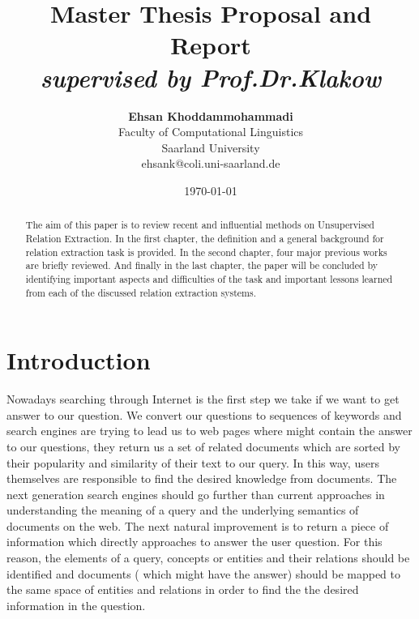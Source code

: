 \documentclass[12pt]{report}
\title{{\bf Master Thesis Proposal and Report} \\
\it supervised by Prof.Dr.Klakow}
\author{ {\bf Ehsan Khoddammohammadi}  \\
Faculty of Computational Linguistics \\
Saarland University\\
{\small ehsank@coli.uni-saarland.de}
}
\date{\today}
\begin{document}
\pagestyle{plain}
\maketitle

\pagebreak
\begin{abstract}

The aim of this paper is to review recent and influential methods on
Unsupervised Relation Extraction. In the first chapter, the definition and a general background
for relation extraction task is provided. In the second chapter, four major previous works are
briefly reviewed. And
finally in the last chapter, the paper will be concluded by identifying important aspects and
difficulties of the task and important lessons learned from each of the discussed relation extraction systems.

\end{abstract}

\pagebreak
\tableofcontents
\pagebreak

\cleardoublepage
{}

\chapter{Introduction}
\label{ch:intro}

Nowadays searching through Internet is the first step we take if we want to get answer to our question.
We convert our questions to sequences of keywords and search engines are trying 
to lead us to web pages where might contain the answer to our questions, they return us a set of related
documents which are sorted by their popularity and similarity of their text to our query.
In this way, users themselves are responsible to find the desired knowledge 
from documents. The next generation search engines should go further than current 
approaches in understanding the meaning of a query and the underlying semantics of documents on 
the web. The next natural improvement is to return a piece of information which directly approaches to 
answer the user question. For this reason, the elements of a query, concepts or entities and 
their relations should be identified and documents ( which might have the answer) should be mapped to the 
same space of entities and relations in order to find the the desired information in the question.
\end{document}
